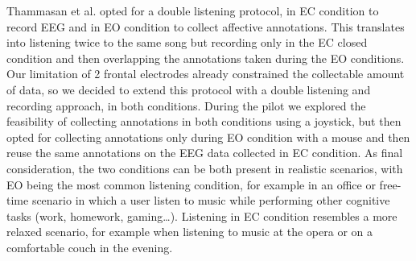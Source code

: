 Thammasan et al. \cite{thammasan_continuous_2016} opted for a double listening protocol, in \ac{EC} condition to record \ac{EEG} and in \ac{EO} condition to collect affective annotations. This translates into listening twice to the same song but recording only in the \ac{EC} closed condition and then overlapping the annotations taken during the \ac{EO} conditions. Our limitation of 2 frontal electrodes already constrained the collectable amount of data, so we decided to extend this protocol with a double listening and recording approach, in both conditions. During the pilot we explored the feasibility of collecting annotations in both conditions using a joystick, but then opted for collecting annotations only during \ac{EO} condition with a mouse and then reuse the same annotations on the \ac{EEG} data collected in \ac{EC} condition.  As final consideration, the two conditions can be both present in realistic scenarios, with \ac{EO} being the most common listening condition, for example in an office or free-time scenario in which a user listen to music while performing other cognitive tasks (work, homework, gaming…). Listening in \ac{EC} condition resembles a more relaxed scenario, for example when listening to music at the opera or on a comfortable couch in the evening.

